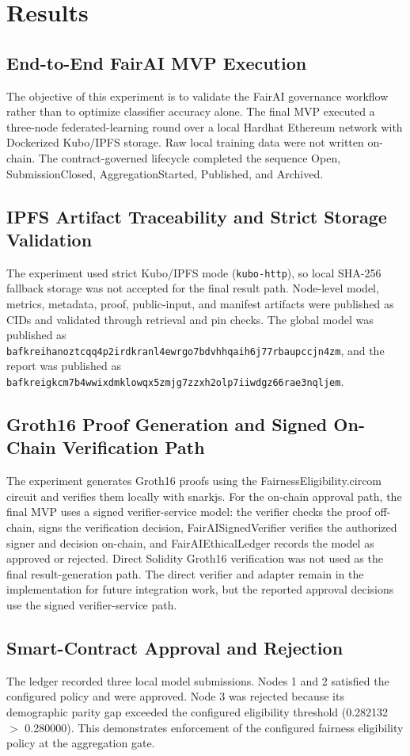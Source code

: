 \section{Results}
\subsection{End-to-End FairAI MVP Execution}
The objective of this experiment is to validate the FairAI governance workflow rather than to optimize classifier accuracy alone. The final MVP executed a three-node federated-learning round over a local Hardhat Ethereum network with Dockerized Kubo/IPFS storage. Raw local training data were not written on-chain. The contract-governed lifecycle completed the sequence Open, SubmissionClosed, AggregationStarted, Published, and Archived.

\subsection{IPFS Artifact Traceability and Strict Storage Validation}
The experiment used strict Kubo/IPFS mode (\texttt{kubo-http}), so local SHA-256 fallback storage was not accepted for the final result path. Node-level model, metrics, metadata, proof, public-input, and manifest artifacts were published as CIDs and validated through retrieval and pin checks. The global model was published as \texttt{bafkreihanoztcqq4p2irdkranl4ewrgo7bdvhhqaih6j77rbaupccjn4zm}, and the report was published as \texttt{bafkreigkcm7b4wwixdmklowqx5zmjg7zzxh2olp7iiwdgz66rae3nqljem}.

\subsection{Groth16 Proof Generation and Signed On-Chain Verification Path}
The experiment generates Groth16 proofs using the FairnessEligibility.circom circuit and verifies them locally with snarkjs. For the on-chain approval path, the final MVP uses a signed verifier-service model: the verifier checks the proof off-chain, signs the verification decision, FairAISignedVerifier verifies the authorized signer and decision on-chain, and FairAIEthicalLedger records the model as approved or rejected. Direct Solidity Groth16 verification was not used as the final result-generation path. The direct verifier and adapter remain in the implementation for future integration work, but the reported approval decisions use the signed verifier-service path.

\subsection{Smart-Contract Approval and Rejection}
The ledger recorded three local model submissions. Nodes 1 and 2 satisfied the configured policy and were approved. Node 3 was rejected because its demographic parity gap exceeded the configured eligibility threshold (0.282132 $>$ 0.280000). This demonstrates enforcement of the configured fairness eligibility policy at the aggregation gate.


